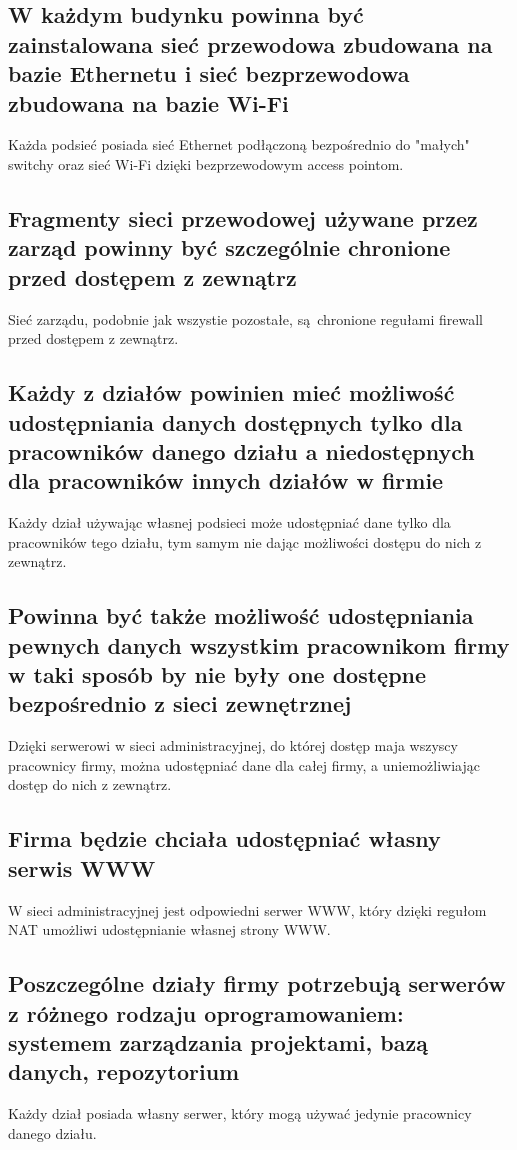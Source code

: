 \documentclass{article}
\begin{document}
    \subsection{W każdym budynku powinna być zainstalowana sieć przewodowa zbudowana na bazie Ethernetu i sieć bezprzewodowa zbudowana na bazie Wi-Fi}
      Każda podsieć posiada sieć Ethernet podłączoną bezpośrednio do "małych" switchy oraz sieć Wi-Fi dzięki bezprzewodowym access pointom.

    \subsection{Fragmenty sieci przewodowej używane przez zarząd powinny być szczególnie chronione przed dostępem z zewnątrz}
      Sieć zarządu, podobnie jak wszystie pozostałe, są chronione regułami firewall przed dostępem z zewnątrz.

    \subsection{Każdy z działów powinien mieć możliwość udostępniania danych dostępnych tylko dla pracowników danego działu a niedostępnych dla pracowników innych  działów w firmie}
      Każdy dział używając własnej podsieci może udostępniać dane tylko dla pracowników tego działu, tym samym nie dając możliwości dostępu do nich z zewnątrz.

    \subsection{Powinna być także możliwość udostępniania pewnych danych wszystkim pracownikom firmy w taki sposób by nie były one dostępne bezpośrednio z sieci zewnętrznej}
      Dzięki serwerowi w sieci administracyjnej, do której dostęp maja wszyscy pracownicy firmy, można udostępniać dane dla całej firmy, a uniemożliwiając dostęp do nich z zewnątrz.

    \subsection{Firma będzie chciała udostępniać własny serwis WWW}
      W sieci administracyjnej jest odpowiedni serwer WWW, który dzięki regułom NAT umożliwi udostępnianie własnej strony WWW.

    \subsection{Poszczególne działy firmy potrzebują serwerów z różnego rodzaju oprogramowaniem: systemem zarządzania projektami, bazą danych, repozytorium}
      Każdy dział posiada własny serwer, który mogą używać jedynie pracownicy danego działu.
\end{document}
